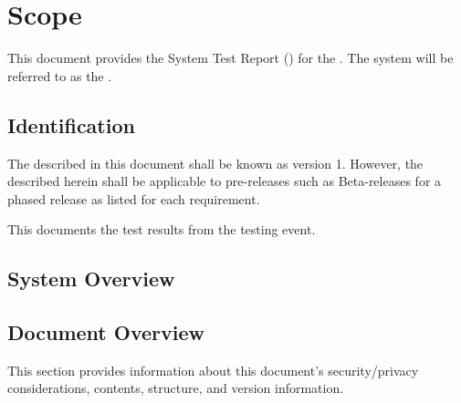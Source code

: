 
\chapter{Scope}
\label{loc:Scope}


This document provides the System Test Report (\STR) for the \ThisSystem. 
The system will be referred to as the \ThisSys.

\section{Identification}
\label{loc:Identification}


The \ThisSystem described in this document shall be known as \ThisSys version 1.
However, the \STR described herein shall be applicable to pre-releases such as Beta-releases for a phased release as listed for each requirement.

This \STR documents the test results from the \TBD testing event.

\section{System Overview}
\label{loc:SystemOverview}






\section{Document Overview}
\label{loc:DocumentOverview}


This section provides information about this document's security/privacy considerations, contents, structure, and version information.






